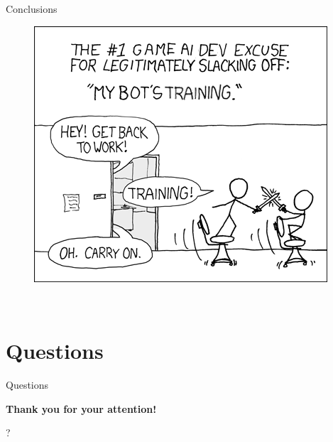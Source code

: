 \documentclass{beamer}
\begin{document}
\begin{frame}{Conclusions}
\begin{figure}[h]
\begin{minipage}[t]{0.55\textwidth}
		\includegraphics[width=\textwidth]{img/training}	   
	\end{minipage}
\end{figure}
\begin{flushright}
			 \\
			\vspace*{-0.2cm}			
\end{flushright}	
\end{frame}

\section{Questions}
\begin{frame}{Questions}
	\begin{center}
    \bfseries
    \Huge
    Thank you for your attention!
    
    \vspace*{1.4cm}			
    ?
  	\end{center}
\end{frame}
\end{document}
